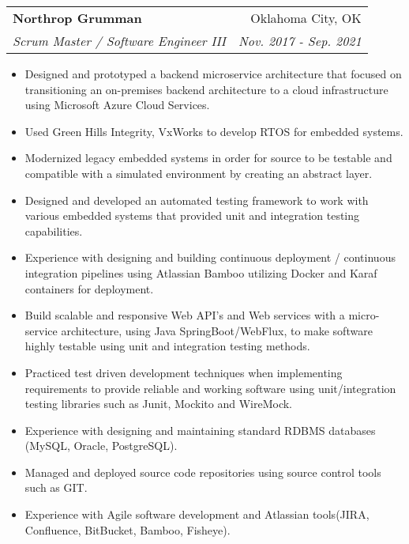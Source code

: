 \documentclass[letterpaper,11pt]{article}
\makeatletter
\newcommand{\resumeItem}[2]{
  \item\small{
    \textbf{#1}{#2 \vspace{-2pt}}
  }
}
\newcommand{\resumeSubheading}[4]{
  \vspace{-1pt}\item
    \begin{tabular*}{0.97\textwidth}[t]{l@{\extracolsep{\fill}}r}
      \textbf{#1} & #2 \\
      \textit{\small#3} & \textit{\small #4} \\
    \end{tabular*}\vspace{-5pt}
}
\newcommand{\resumeItemListStart}{\begin{itemize}}
\newcommand{\resumeItemListEnd}{\end{itemize}\vspace{-5pt}}
\makeatother
\begin{document}
    \resumeSubheading
      {Northrop Grumman}{Oklahoma City, OK}
      {Scrum Master / Software Engineer III}{Nov. 2017 - Sep. 2021}
      \resumeItemListStart
        \resumeItem{}
          {Designed and prototyped a backend microservice architecture that focused on transitioning an on-premises backend architecture to a cloud infrastructure using Microsoft Azure Cloud Services.}
        \resumeItem{}
          {Used Green Hills Integrity, VxWorks to develop RTOS for embedded systems.}
        \resumeItem{}
          {Modernized legacy embedded systems in order for source to be testable and compatible with a simulated environment by creating an abstract layer.}
        \resumeItem{}
          {Designed and developed an automated testing framework to work with various embedded systems that provided unit and integration testing capabilities.}
        \resumeItem{}
          {Experience with designing and building continuous deployment / continuous integration pipelines using Atlassian Bamboo utilizing Docker and Karaf containers for deployment.}
        \resumeItem{}
          {Build scalable and responsive Web API's and Web services with a micro-service architecture, using Java SpringBoot/WebFlux, to make software highly testable using unit and integration testing methods.}
        \resumeItem{}
          {Practiced test driven development techniques when implementing requirements to provide reliable and working software using unit/integration testing libraries such as Junit, Mockito and WireMock.}
        \resumeItem{}
          {Experience with designing and maintaining standard RDBMS databases (MySQL, Oracle, PostgreSQL).}
        \resumeItem{}
          {Managed and deployed source code repositories using source control tools such as GIT.}
        \resumeItem{}
          {Experience with Agile software development and Atlassian tools(JIRA, Confluence, BitBucket, Bamboo, Fisheye).}
      \resumeItemListEnd
\end{document}
